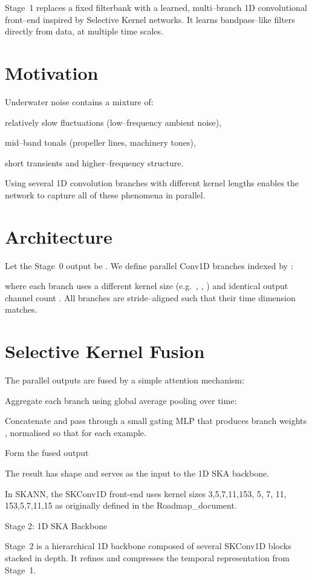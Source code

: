 \documentclass[12pt]{article}
\begin{document}
Stage 1 replaces a fixed filterbank with a learned, multi–branch 1D convolutional front–end inspired by Selective Kernel networks. It learns bandpass–like filters directly from data, at multiple time scales.

\section*{Motivation}
Underwater noise contains a mixture of:

relatively slow fluctuations (low–frequency ambient noise),

mid–band tonals (propeller lines, machinery tones),

short transients and higher–frequency structure.

Using several 1D convolution branches with different kernel lengths enables the network to capture all of these phenomena in parallel.

\section*{Architecture}
Let the Stage 0 output be . We define  parallel Conv1D branches indexed by :


where each branch uses a different kernel size (e.g. , , ) and identical output channel count . All branches are stride–aligned such that their time dimension  matches.

\section*{Selective Kernel Fusion}
The parallel outputs are fused by a simple attention mechanism:

Aggregate each branch using global average pooling over time:


Concatenate and pass through a small gating MLP that produces branch weights , normalised so that  for each example.

Form the fused output


The result  has shape  and serves as the input to the 1D SKA backbone.

In SKANN, the SKConv1D front-end uses kernel sizes 3,5,7,11,153, 5, 7, 11, 153,5,7,11,15 as originally defined in the Roadmap_document.

Stage 2: 1D SKA Backbone

Stage 2 is a hierarchical 1D backbone composed of several SKConv1D blocks stacked in depth. It refines and compresses the temporal representation from Stage 1.
\end{document}
